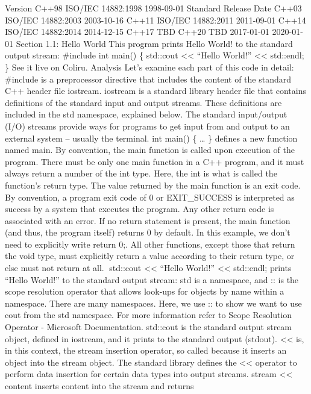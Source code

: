 Version C++98 ISO/IEC 14882:1998 1998-09-01 Standard Release Date C++03
ISO/IEC 14882:2003 2003-10-16 C++11 ISO/IEC 14882:2011 2011-09-01 C++14
ISO/IEC 14882:2014 2014-12-15 C++17 TBD C++20 TBD 2017-01-01 2020-01-01
Section 1.1: Hello World This program prints Hello World! to the
standard output stream: \#include int main() \{ std::cout
\textless\textless{} ``Hello World!'' \textless\textless{} std::endl; \}
See it live on Coliru. Analysis Let's examine each part of this code in
detail: \#include is a preprocessor directive that includes the content
of the standard C++ header ﬁle iostream. iostream is a standard library
header ﬁle that contains deﬁnitions of the standard input and output
streams. These deﬁnitions are included in the std namespace, explained
below. The standard input/output (I/O) streams provide ways for programs
to get input from and output to an external system -- usually the
terminal. int main() \{ \ldots{} \} deﬁnes a new function named main. By
convention, the main function is called upon execution of the program.
There must be only one main function in a C++ program, and it must
always return a number of the int type. Here, the int is what is called
the function's return type. The value returned by the main function is
an exit code. By convention, a program exit code of 0 or EXIT\_SUCCESS
is interpreted as success by a system that executes the program. Any
other return code is associated with an error. If no return statement is
present, the main function (and thus, the program itself) returns 0 by
default. In this example, we don't need to explicitly write return 0;.
All other functions, except those that return the void type, must
explicitly return a value according to their return type, or else must
not return at all. std::cout \textless\textless{} ``Hello World!''
\textless\textless{} std::endl; prints ``Hello World!'' to the standard
output stream: std is a namespace, and :: is the scope resolution
operator that allows look-ups for objects by name within a namespace.
There are many namespaces. Here, we use :: to show we want to use cout
from the std namespace. For more information refer to Scope Resolution
Operator - Microsoft Documentation. std::cout is the standard output
stream object, deﬁned in iostream, and it prints to the standard output
(stdout). \textless\textless{} is, in this context, the stream insertion
operator, so called because it inserts an object into the stream object.
The standard library deﬁnes the \textless\textless{} operator to perform
data insertion for certain data types into output streams. stream
\textless\textless{} content inserts content into the stream and returns
